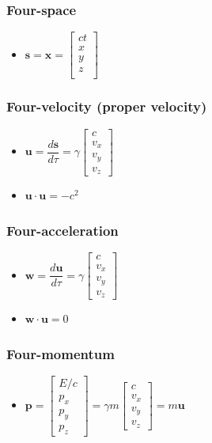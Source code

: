 \documentclass[]{report}
\newcommand \tab[1][1cm]{\hspace*{#1}}
\newcommand{\itemt}{\item \tab}
\begin{document}
\subsubsection{Four-space}			
\begin{itemize}
\itemt \(\mathbf{s} = \mathbf{x} = 
\begin{bmatrix}
ct \\
x \\
y \\
z \\
\end{bmatrix}
\)
\end{itemize}

\subsubsection{Four-velocity (proper velocity)}			
\begin{itemize}
\itemt \(\textbf{u} = \dfrac{d\textbf{s}}{d\tau} = \gamma 
\begin{bmatrix} 
c \\
v_x\\
v_y\\
v_z
\end{bmatrix}\)
\itemt \( \textbf{u}\cdot\textbf{u} = -c^2  \)
\end{itemize}

\subsubsection{Four-acceleration}			
\begin{itemize}
\itemt \(\textbf{w} = \dfrac{d\textbf{u}}{d\tau} = \gamma 
\begin{bmatrix} 
c \\
v_x\\
v_y\\
v_z
\end{bmatrix}\)
\item \( \textbf{w}\cdot\textbf{u} = 0 \)
\end{itemize}

\subsubsection{Four-momentum}			
\begin{itemize}
\itemt \(\textbf{p} = 
\begin{bmatrix} 
E/c \\
p_x\\
p_y\\
p_z
\end{bmatrix} = \gamma m
\begin{bmatrix} 
c \\
v_x\\
v_y\\
v_z
\end{bmatrix} = m\textbf{u}\)
\end{itemize}	
                
\end{document}
